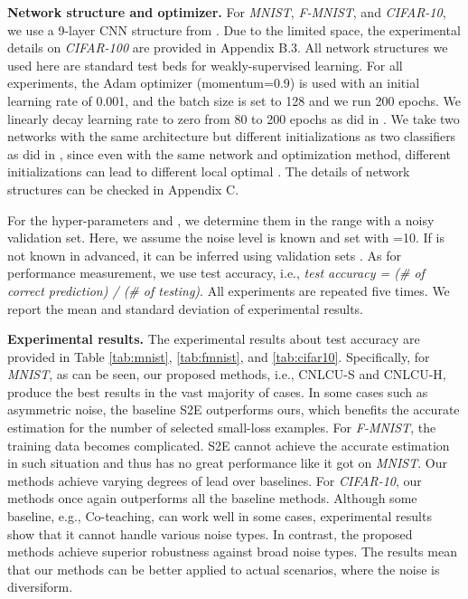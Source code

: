 \documentclass[11pt]{article}
\begin{document}
\textbf{Network structure and optimizer.} For \textit{MNIST}, \textit{F-MNIST}, and \textit{CIFAR-10}, we use a 9-layer CNN structure from \citep{han2018co}. Due to the limited space, the experimental details on \textit{CIFAR-100} are provided in Appendix B.3. All network structures we used here are standard test beds for weakly-supervised learning. For all experiments, the Adam optimizer \citep{kingma2014adam} (momentum=0.9) is used with an initial learning rate of 0.001, and the batch size is set to 128 and we run 200 epochs.  We linearly decay learning rate to zero from 80 to 200 epochs as did in \citep{han2018co}. We take two networks with the same architecture but different initializations as two classifiers as did in \citep{han2018co,yu2019does,wei2020combating}, since even with the same network and optimization method, different initializations can lead to different local optimal \citep{han2018co}. The details of network structures can be checked in Appendix C.

For the hyper-parameters  and , we determine them in the range  with a noisy validation set. Here, we assume the noise level  is known and set  with =10. If  is not known in advanced, it can be inferred using validation sets \citep{liu2016classification,yu2018efficient}. As for performance measurement, we use test accuracy, i.e., \textit{test accuracy = (\# of correct prediction) / (\# of testing)}. All experiments are repeated five times. We report the mean and standard deviation of experimental results. 

\textbf{Experimental results.} The experimental results about test accuracy are provided in Table \ref{tab:mnist}, \ref{tab:fmnist}, and \ref{tab:cifar10}. Specifically, for \textit{MNIST}, as can be seen, our proposed methods, i.e., CNLCU-S and CNLCU-H, produce the best results in the vast majority of cases. In some cases such as asymmetric noise, the baseline S2E outperforms ours, which benefits the accurate estimation for the number of selected small-loss examples. For  \textit{F-MNIST}, the training data becomes complicated. S2E cannot achieve the accurate estimation in such situation and thus has no great performance like it got on \textit{MNIST}. Our methods achieve varying degrees of lead over baselines. For \textit{CIFAR-10}, our methods once again outperforms all the baseline methods. Although some baseline, e.g., Co-teaching, can work well in some cases, experimental results show that it cannot handle various noise types. In contrast, the proposed methods achieve superior robustness against broad noise types. The results mean that our methods can be better applied to actual scenarios, where the noise is diversiform. 
\end{document}
